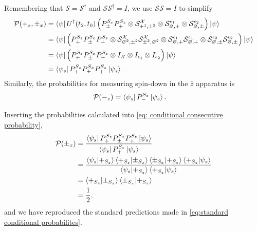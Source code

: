 Remembering that $\mathcal{S} = \mathcal{S}^\dagger$ and $\mathcal{S}\mathcal{S}^\dagger = I$, we use $\mathcal{S}\mathcal{S} = I$ to simplify
\begin{align}
  \mathcal{P}(+_z, \pm_x) &= \bra{\psi}  U^\dagger(t_2, t_0) \left(P^{S_x}_\pm P^{S_z}_+ \otimes \mathcal{S}^\mathcal{X}_{+^1, \pm^2 } \otimes \mathcal{S}^{\epsilon_1}_{\varnothing, +} \otimes \mathcal{S}^{\epsilon_2}_{\varnothing, \pm} \right) \ket{\psi} \\ \nonumber
  &= \bra{\psi} \left(P^{S_z}_+ P^{S_x}_\pm P^{S_z}_+ \otimes \mathcal{S}^\mathcal{X}_{\varnothing^2, \pm^2}\mathcal{S}^\mathcal{X}_{\pm^2, \varnothing^2} \otimes \mathcal{S}^{\epsilon_1}_{\varnothing, +} \mathcal{S}^{\epsilon_1}_{ \varnothing, +} \otimes \mathcal{S}^{\epsilon_2}_{\varnothing, \pm} \mathcal{S}^{\epsilon_2}_{\varnothing, \pm} \right) \ket{\psi} \\ \nonumber
  &= \bra{\psi} \left(P^{S_z}_+ P^{S_x}_\pm P^{S_z}_+ \otimes I_\mathcal{X}  \otimes I_{\epsilon_1} \otimes I_{\epsilon_2} \right) \ket{\psi} \\ \nonumber
  &= \bra{\psi_s} P^{S_z}_+ P^{S_x}_\pm P^{S_z}_+ \ket{\psi_s}.
\end{align}
Similarly, the probabilities for measuring spin-down in the $\hat{z}$ apparatus is
\begin{align}
  \mathcal{P}(-_z) &= \bra{\psi_s} P^{S_z}_- \ket{\psi_s}.
\end{align}

Inserting the probabilities calculated into \autoref{eq: conditional consecutive probability},
\begin{align}
    \mathcal{P}(\pm_x) &= \frac{\bra{\psi_s} P^{S_z}_+ P^{S_x}_\pm P^{S_z}_+ \ket{\psi_s}}{\bra{\psi_s} P^{S_z}_+ \ket{\psi_s}} \\ \nonumber
    &= \frac{\braket{\psi_s | +_{S_z}} \braket{+_{S_z}|\pm_{S_x}} \braket{\pm_{S_x}|+_{S_z}} \braket{+_{S_z}|\psi_s}}{\braket{\psi_s | +_{S_z}} \braket{+_{S_z}|\psi_s}} \\ \nonumber
    &= \braket{+_{S_z}|\pm_{S_x}} \braket{\pm_{S_x}|+_{S_z}} \\ \nonumber
    &= \frac{1}{2},
\end{align}
and we have reproduced the standard predictions made in \autoref{eq:standard conditional probabilites}.

